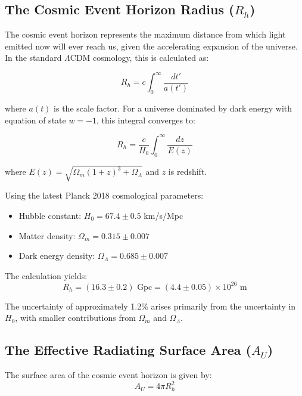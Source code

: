 \documentclass[11pt,a4paper]{article}
\theoremstyle{definition}
\theoremstyle{remark}
\begin{document}
\subsection{The Cosmic Event Horizon Radius (\(R_h\))}

The cosmic event horizon represents the maximum distance from which light emitted now will ever reach us, given the accelerating expansion of the universe. In the standard \(\Lambda\)CDM cosmology, this is calculated as:

\begin{equation}
    R_h = c \int_0^{\infty} \frac{dt'}{a(t')}
\end{equation}

where \(a(t)\) is the scale factor. For a universe dominated by dark energy with equation of state \(w = -1\), this integral converges to:

\begin{equation}
    R_h = \frac{c}{H_0} \int_0^{\infty} \frac{dz}{E(z)}
\end{equation}

where \(E(z) = \sqrt{\Omega_m(1+z)^3 + \Omega_\Lambda}\) and \(z\) is redshift.

Using the latest Planck 2018 cosmological parameters:
\begin{itemize}
    \item Hubble constant: \(H_0 = 67.4 \pm 0.5\) km/s/Mpc
    \item Matter density: \(\Omega_m = 0.315 \pm 0.007\)
    \item Dark energy density: \(\Omega_\Lambda = 0.685 \pm 0.007\)
\end{itemize}

The calculation yields:
\begin{equation}
    R_h = (16.3 \pm 0.2) \text{ Gpc} = (4.4 \pm 0.05) \times 10^{26} \text{ m}
\end{equation}

The uncertainty of approximately 1.2\% arises primarily from the uncertainty in \(H_0\), with smaller contributions from \(\Omega_m\) and \(\Omega_\Lambda\).

\subsection{The Effective Radiating Surface Area (\(A_U\))}

The surface area of the cosmic event horizon is given by:
\begin{equation}
    A_U = 4\pi R_h^2
\end{equation}
\end{document}

